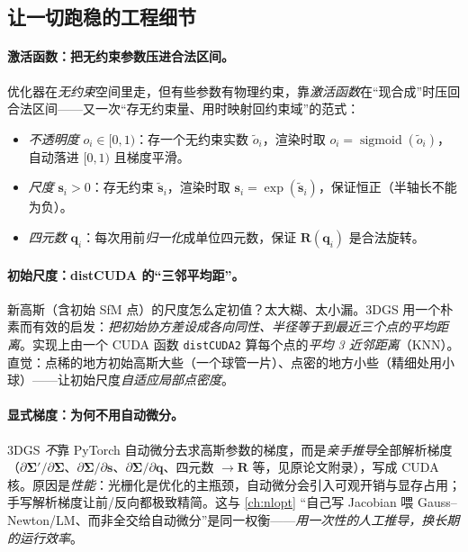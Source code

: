 \subsection{让一切跑稳的工程细节}

\paragraph{激活函数：把无约束参数压进合法区间。}
优化器在\emph{无约束}空间里走，但有些参数有物理约束，靠\emph{激活函数}在“现合成”时压回合法区间——又一次“存无约束量、用时映射回约束域”的范式：
\begin{itemize}
  \item \emph{不透明度} $o_i\in[0,1)$：存一个无约束实数 $\tilde o_i$，渲染时取 $o_i=\operatorname{sigmoid}(\tilde o_i)$，自动落进 $[0,1)$ 且梯度平滑。
  \item \emph{尺度} $\mathbf s_i>0$：存无约束 $\tilde{\mathbf s}_i$，渲染时取 $\mathbf s_i=\exp(\tilde{\mathbf s}_i)$，保证恒正（半轴长不能为负）。
  \item \emph{四元数} $\mathbf q_i$：每次用前\emph{归一化}成单位四元数，保证 $\mathbf R(\mathbf q_i)$ 是合法旋转。
\end{itemize}

\paragraph{初始尺度：distCUDA 的“三邻平均距”。}
新高斯（含初始 SfM 点）的尺度怎么定初值？太大糊、太小漏。3DGS 用一个朴素而有效的启发：\emph{把初始协方差设成各向同性、半径等于到最近三个点的平均距离}。实现上由一个 CUDA 函数 \texttt{distCUDA2} 算每个点的\emph{平均 3 近邻距离}（KNN）。直觉：点稀的地方初始高斯大些（一个球管一片）、点密的地方小些（精细处用小球）——让初始尺度\emph{自适应局部点密度}。

\paragraph{显式梯度：为何不用自动微分。}
3DGS \emph{不}靠 PyTorch 自动微分去求高斯参数的梯度，而是\emph{亲手推导}全部解析梯度（$\partial\boldsymbol\Sigma'/\partial\boldsymbol\Sigma$、$\partial\boldsymbol\Sigma/\partial\mathbf s$、$\partial\boldsymbol\Sigma/\partial\mathbf q$、四元数 $\to\mathbf R$ 等，见原论文附录），写成 CUDA 核。原因是\emph{性能}：光栅化是优化的主瓶颈，自动微分会引入可观开销与显存占用；手写解析梯度让前/反向都极致精简。这与 \cref{ch:nlopt} “自己写 Jacobian 喂 Gauss--Newton/LM、而非全交给自动微分”是同一权衡——\emph{用一次性的人工推导，换长期的运行效率}。


